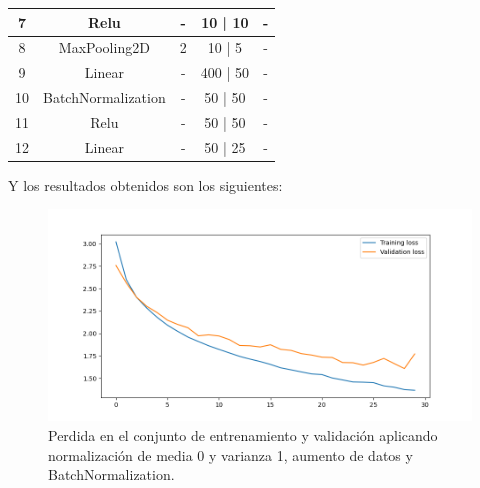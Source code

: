 \documentclass[12pt, spanish]{article}
\begin{document}
\begin{table}[H]
{\begin{tabular}{|c|c|c|c|c|}
7                       & Relu                  & -                                                                                    & 10 | 10                           & -                                                                                                 \\ \hline
8                       & MaxPooling2D          & 2                                                                                    & 10 | 5                            & -                                                                                                 \\ \hline
9                       & Linear                & -                                                                                    & 400 | 50                          & -                                                                                                 \\ \hline
10                      & BatchNormalization    & -                                                                                    & 50 | 50                           & -                                                                                                 \\ \hline
11                      & Relu                  & -                                                                                    & 50 | 50                           & -                                                                                                 \\ \hline
12                      & Linear                & -                                                                                    & 50 | 25                           & -                                                                                                 \\ \hline
\end{tabular}%
}
\end{table}


Y los resultados obtenidos son los siguientes:

\begin{figure}[H]
  \centering
      \includegraphics[width=\textwidth]{1-2-batch.png}
 		\caption{Perdida en el conjunto de entrenamiento y validación aplicando normalización de media 0 y varianza 1, aumento de datos y BatchNormalization.}
\end{figure}
\end{document}
